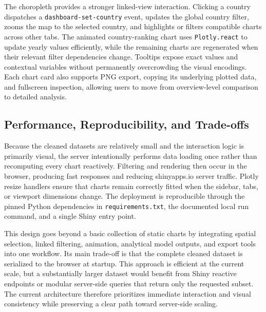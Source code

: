 The choropleth provides a stronger linked-view interaction. Clicking a country dispatches a \texttt{dashboard-set-country} event, updates the global country filter, zooms the map to the selected country, and highlights or filters compatible charts across other tabs. The animated country-ranking chart uses \texttt{Plotly.react} to update yearly values efficiently, while the remaining charts are regenerated when their relevant filter dependencies change. Tooltips expose exact values and contextual variables without permanently overcrowding the visual encodings. Each chart card also supports PNG export, copying its underlying plotted data, and fullscreen inspection, allowing users to move from overview-level comparison to detailed analysis.

\subsection{Performance, Reproducibility, and Trade-offs}
Because the cleaned datasets are relatively small and the interaction logic is primarily visual, the server intentionally performs data loading once rather than recomputing every chart reactively. Filtering and rendering then occur in the browser, producing fast responses and reducing shinyapps.io server traffic. Plotly resize handlers ensure that charts remain correctly fitted when the sidebar, tabs, or viewport dimensions change. The deployment is reproducible through the pinned Python dependencies in \texttt{requirements.txt}, the documented local run command, and a single Shiny entry point.

This design goes beyond a basic collection of static charts by integrating spatial selection, linked filtering, animation, analytical model outputs, and export tools into one workflow. Its main trade-off is that the complete cleaned dataset is serialized to the browser at startup. This approach is efficient at the current scale, but a substantially larger dataset would benefit from Shiny reactive endpoints or modular server-side queries that return only the requested subset. The current architecture therefore prioritizes immediate interaction and visual consistency while preserving a clear path toward server-side scaling.
